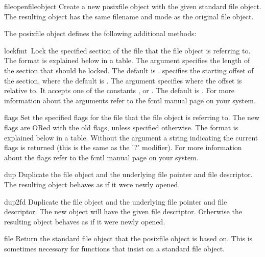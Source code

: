 \begin{funcdesc}{fileopen}{fileobject}
 Create a new posixfile object with the given standard file object.
 The resulting object has the same filename and mode as the original
 file object.
\end{funcdesc}

The posixfile object defines the following additional methods:

\begin{funcdesc}{lock}{fmt\, }
 Lock the specified section of the file that the file object is
 referring to.  The format is explained
 below in a table.  The  argument specifies the length of the
 section that should be locked. The default is . 
 specifies the starting offset of the section, where the default is
 .  The  argument specifies where the offset is
 relative to. It accepts one of the constants ,
  or .  The default is .
 For more information about the arguments refer to the fcntl
 manual page on your system.
\end{funcdesc}

\begin{funcdesc}{flags}{}
 Set the specified flags for the file that the file object is referring
 to.  The new flags are ORed with the old flags, unless specified
 otherwise.  The format is explained below in a table.  Without
 the  argument
 a string indicating the current flags is returned (this is
 the same as the '?' modifier).  For more information about the flags
 refer to the fcntl manual page on your system.
\end{funcdesc}

\begin{funcdesc}{dup}{}
 Duplicate the file object and the underlying file pointer and file
 descriptor.  The resulting object behaves as if it were newly
 opened.
\end{funcdesc}

\begin{funcdesc}{dup2}{fd}
 Duplicate the file object and the underlying file pointer and file
 descriptor.  The new object will have the given file descriptor.
 Otherwise the resulting object behaves as if it were newly opened.
\end{funcdesc}

\begin{funcdesc}{file}{}
 Return the standard file object that the posixfile object is based
 on.  This is sometimes necessary for functions that insist on a
 standard file object.
\end{funcdesc}

